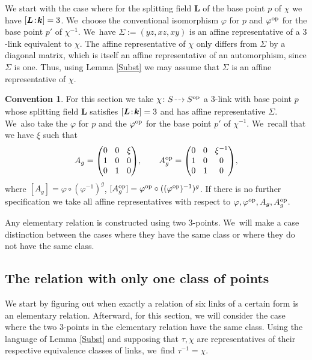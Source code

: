 \documentclass[JEP,XML,SOM,Unicode,NoFloatCountersInSection, NoEqCountersInSection,published]{cedram}
\newcommand{\dradpl}{{\hspace*{-2mm}\begin{tikzcd}[ampersand replacement=\&,column sep = scriptsize]\mbox{}\ar[r,dashed]\&\mbox{}\end{tikzcd}\hspace*{-2mm}}}
\newcommand{\dratst}{{\hspace*{-2.5mm}\begin{tikzcd}[ampersand replacement=\&,column sep = small]\mbox{}\ar[r,dashed]\&\mbox{}\end{tikzcd}\hspace*{-2mm}}}
\let\drascst\dratst
\newcommand{\dra}{\mathchoice{\dradpl}{\dratst}{\drascst}{\drascst}}
\newcommand{\op}{\textup{op}}
\newcommand{\sep}{\mkern2mu{:}\mkern2mu}
\theoremstyle{definition}
\newtheorem{convention}[theorem]{Convention}
\newcommand{\kk}{{\boldsymbol{k}}}
\newcommand{\LL}{{\boldsymbol{L}}}
\begin{document}
We start with the case where for the splitting field $\LL$ of the base point $p$ of $\chi$ we have $[\LL\sep \kk] = 3$. We~choose the conventional isomorphism $\varphi$ for $p$ and $\varphi^{\op}$ for the base point $p'$ of $\chi^{-1}$. We~have $\Sigma := (yz,xz,xy)$ is an affine representative of a $3$\nobreakdash-link equivalent to $\chi$. The affine representative of $\chi$ only differs from $\Sigma$ by a diagonal matrix, which is itself an affine representative of an automorphism, since $\Sigma$ is one. Thus, using Lemma \ref{Subst} we may assume that $\Sigma$ is an affine representative of $\chi$.
\begin{convention} \label{conv: 5.1}
For this section we take $\chi \colon S \dra S^{\op}$ a $3$\nobreakdash-link with base point $p$ whose splitting field $\LL$ satisfies $[\LL\sep \kk] = 3$ and has affine representative $\Sigma$. We~also take the $\varphi$ for $p$ and the $\varphi^{\op}$ for the base point $p'$ of $\chi^{-1}$. We~recall that we have $\xi$ such that
\[\arraycolsep4.5pt
A_g = \begin{pmatrix}
0 & 0 & \xi \\
1 & 0 & 0 \\
0 & 1 & 0
\end{pmatrix}\!, \qquad A_g^{\op} = \begin{pmatrix}
0 & 0 & \xi^{-1} \\
1 & 0 & 0 \\
0 & 1 & 0
\end{pmatrix}\!,
\]
where $[A_g] = \varphi \circ (\varphi^{-1})^g$, $[A_g^{\op}] = \varphi^{\op} \circ ((\varphi^{\op})^{-1})^g$. If there is no further specification we take all affine representatives with respect to $\varphi, \varphi^{\op}, A_g, A_g^{\op}$.
\end{convention}
Any elementary relation is constructed using two $3$\nobreakdash-points. We~will make a case distinction between the cases where they have the same class or where they do not have the same class.
\subsection{The relation with only one class of points}
We start by figuring out when exactly a relation of six links of a certain form is an elementary relation. Afterward, for this section, we will consider the case where the two $3$\nobreakdash-points in the elementary relation have the same class. Using the language of Lemma \ref{Subst} and supposing that $\tau, \chi$ are representatives of their respective equivalence classes of links, we~find $\tau^{-1} = \chi$.
\end{document}
